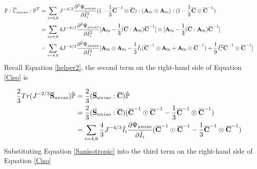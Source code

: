 \begin{equation} \label{part13}
\begin{split}
\mathbb{P} : \overline{\mathbb{C}}_{aniso} : \mathbb{P}^T 
&= \sum_{i = 4, 6}J^{-4/3}\frac{\partial^2\Psi_{aniso}}{\partial{\bar{I}_i}^2} (\mathbb{I} - \frac{1}{3}\overline{\bold{C}}^{-1} \otimes \overline{\bold{C}}):(\bold{A}_{0i} \otimes \bold{A}_{0i}):(\mathbb{I} - \frac{1}{3}\overline{\bold{C}} \otimes \overline{\bold{C}}^{-1}) \\
&= \sum_{i = 4, 6} 4J^{-4/3}\frac{\partial^2\Psi_{aniso}}{\partial{\bar{I}_i}^2}
[\bold{A}_{0i} - \frac{1}{3}(\overline{\bold{C}} : \bold{A}_{0i})\overline{\bold{C}}^{-1}] \otimes
[\bold{A}_{0i} - \frac{1}{3}(\overline{\bold{C}} : \bold{A}_{0i})\overline{\bold{C}}^{-1}] \\
&= \sum_{i = 4, 6} 4J^{-4/3}\frac{\partial^2\Psi_{aniso}}{\partial{\bar{I}_i}^2}
[\bold{A}_{0i} \otimes \bold{A}_{0i} - \frac{1}{3}\bar{I}_i
(\overline{\bold{C}}^{-1} \otimes \bold{A}_{0i} + \bold{A}_{0i} \otimes \overline{\bold{C}}^{-1}) 
+ \frac{1}{9}\bar{I}_i^2 \overline{\bold{C}}^{-1} \otimes \overline{\bold{C}}^{-1}]
\end{split}
\end{equation}
Recall Equation \ref{helper2}, the second term on the right-hand side of Equation \ref{Ciso} is

\begin{equation} \label{part23}
\begin{split}
\frac{2}{3}Tr(J^{-2/3}\overline{\bold{S}}_{aniso})\tilde{\mathbb{P}} &= \frac{2}{3}(\overline{\bold{S}}_{aniso} : \overline{\bold{C}}) \tilde{\mathbb{P}} \\
&= \frac{2}{3}(\overline{\bold{S}}_{aniso} : \overline{\bold{C}}) 
(\overline{\bold{C}}^{-1} \odot \overline{\bold{C}}^{-1} - \frac{1}{3}\overline{\bold{C}}^{-1}\otimes\overline{\bold{C}}^{-1}) \\
&= \sum_{i = 4, 6}\frac{4}{3}J^{-4/3}\bar{I}_i\frac{\partial{\Psi_{aniso}}}{\partial\bar{I}_i}
(\overline{\bold{C}}^{-1} \odot \overline{\bold{C}}^{-1} - \frac{1}{3}\overline{\bold{C}}^{-1}\otimes\overline{\bold{C}}^{-1}) \\
\end{split}
\end{equation}
Substituting Equation \ref{Sanisotropic} into the third term on the right-hand side of Equation \ref{Ciso}

